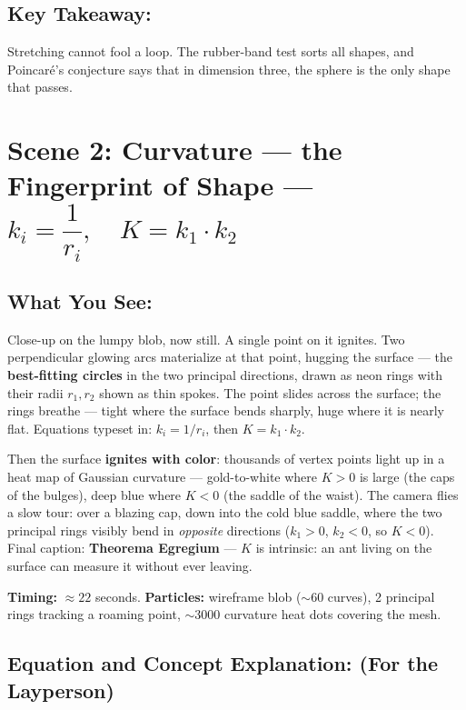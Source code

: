 \documentclass[11pt]{article}
\begin{document}
\subsection*{Key Takeaway:}

Stretching cannot fool a loop. The rubber-band test sorts all shapes, and Poincar\'e's
conjecture says that in dimension three, the sphere is the only shape that passes.

\hrulefill

\section*{Scene 2: Curvature --- the Fingerprint of Shape --- \( k_i = \dfrac{1}{r_i},\quad K = k_1 \cdot k_2 \)}

\subsection*{What You See:}

Close-up on the lumpy blob, now still. A single point on it ignites. Two
perpendicular glowing arcs materialize at that point, hugging the surface --- the
\textbf{best-fitting circles} in the two principal directions, drawn as neon rings
with their radii $r_1, r_2$ shown as thin spokes. The point slides across the
surface; the rings breathe --- tight where the surface bends sharply, huge where it is
nearly flat. Equations typeset in: \( k_i = 1/r_i \), then \( K = k_1 \cdot k_2 \).

Then the surface \textbf{ignites with color}: thousands of vertex points light up in a
heat map of Gaussian curvature --- gold-to-white where $K > 0$ is large (the caps of
the bulges), deep blue where $K < 0$ (the saddle of the waist). The camera flies a
slow tour: over a blazing cap, down into the cold blue saddle, where the two principal
rings visibly bend in \emph{opposite} directions ($k_1 > 0$, $k_2 < 0$, so $K < 0$).
Final caption: \textbf{Theorema Egregium} --- \( K \) is intrinsic: an ant living on
the surface can measure it without ever leaving.

\textbf{Timing:} $\approx 22$ seconds. \textbf{Particles:} wireframe blob
($\sim$60 curves), 2 principal rings tracking a roaming point, $\sim$3000 curvature
heat dots covering the mesh.

\subsection*{Equation and Concept Explanation: (For the Layperson)}
\end{document}
